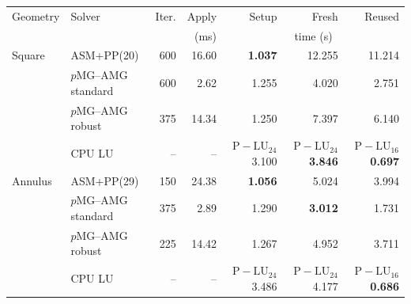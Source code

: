 \begin{tabular}{llrrrrr}
\toprule
Geometry & Solver & Iter. & Apply & Setup & Fresh & Reused \\
 & & & (ms) & \multicolumn{3}{c}{time (s)} \\
\midrule
Square & ASM+PP(20) & 600 & 16.60 & \textbf{1.037} & 12.255 & 11.214 \\
 & $p$MG--AMG standard & 600 & 2.62 & 1.255 & 4.020 & 2.751 \\
 & $p$MG--AMG robust & 375 & 14.34 & 1.250 & 7.397 & 6.140 \\
 & CPU LU & -- & -- & $\mathrm{P\!-\!LU}_{24}$ 3.100 & \textbf{$\mathrm{P\!-\!LU}_{24}$ 3.846} & \textbf{$\mathrm{P\!-\!LU}_{16}$ 0.697} \\
\midrule
Annulus & ASM+PP(29) & 150 & 24.38 & \textbf{1.056} & 5.024 & 3.994 \\
 & $p$MG--AMG standard & 375 & 2.89 & 1.290 & \textbf{3.012} & 1.731 \\
 & $p$MG--AMG robust & 225 & 14.42 & 1.267 & 4.952 & 3.711 \\
 & CPU LU & -- & -- & $\mathrm{P\!-\!LU}_{24}$ 3.486 & $\mathrm{P\!-\!LU}_{24}$ 4.177 & \textbf{$\mathrm{P\!-\!LU}_{16}$ 0.686} \\
\bottomrule
\end{tabular}
